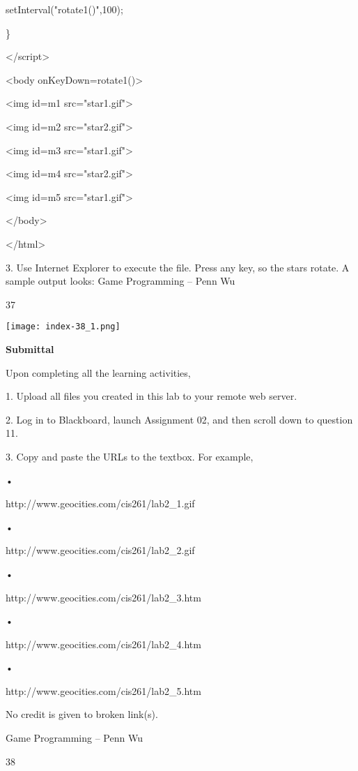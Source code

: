 \documentclass[
]{article}
\begin{document}
setInterval("rotate1()",100);

\}

\textless/script\textgreater{}

\textless body
onKeyDown=\textquotesingle rotate1()\textquotesingle\textgreater{}

\textless img id=m1 src="star1.gif"\textgreater{}

\textless img id=m2 src="star2.gif"\textgreater{}

\textless img id=m3 src="star1.gif"\textgreater{}

\textless img id=m4 src="star2.gif"\textgreater{}

\textless img id=m5 src="star1.gif"\textgreater{}

\textless/body\textgreater{}

\textless/html\textgreater{}

3. Use Internet Explorer to execute the file. Press any key, so the
stars rotate. A sample output looks: Game Programming -- Penn Wu

37

\protect\hypertarget{index_split_003.htmlux5cux23p38}{}{}\texttt{[image: index-38\_1.png]}

\textbf{}

\textbf{Submittal}

Upon completing all the learning activities,

1. Upload all files you created in this lab to your remote web server.

2. Log in to Blackboard, launch Assignment 02, and then scroll down to
question 11.

3. Copy and paste the URLs to the textbox. For example,

•

http://www.geocities.com/cis261/lab2\_1.gif

•

http://www.geocities.com/cis261/lab2\_2.gif

•

http://www.geocities.com/cis261/lab2\_3.htm

•

http://www.geocities.com/cis261/lab2\_4.htm

•

http://www.geocities.com/cis261/lab2\_5.htm

No credit is given to broken link(s).

Game Programming -- Penn Wu

38
\end{document}
